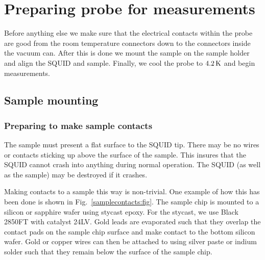 %
%



\section{Preparing probe for measurements}

Before anything else we make sure that the electrical contacts within 
the probe are good from the room temperature connectors down to the 
connectors inside the vacuum can. After this is done we mount the
sample on the sample holder and align the SQUID and sample. Finally, 
we cool the probe to $4.2\,\kelvin$ and begin measurements.

\subsection{Sample mounting}

\subsubsection{Preparing to make sample contacts}

The sample must present a flat surface to the SQUID tip. 
There may be no wires or contacts sticking up above the surface of the sample. 
This insures that the SQUID cannot crash into anything during
normal operation. The SQUID (as well as the sample) 
may be destroyed if it crashes. 

Making contacts to a sample this way is non-trivial. One example of how this
has been done is shown in Fig.~\ref{samplecontacts:fig}. The sample chip
is mounted to a silicon or sapphire wafer using stycast epoxy.
For the stycast, we use Black 2850FT with catalyst 24LV\cite{stycast_epoxy}. 
Gold leads are
evaporated such that they overlap the contact pads on the sample chip
surface and make contact to the bottom silicon wafer. Gold or copper
wires can then be attached to using silver paste or indium solder
such that they remain below the surface of the sample chip.

